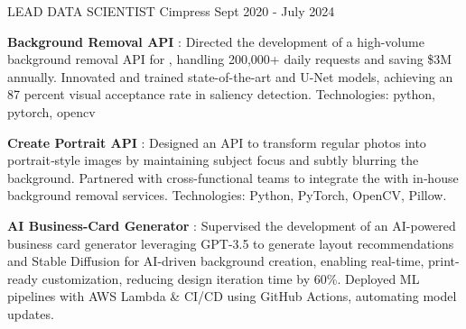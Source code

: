 
\begin{cventries}

    \cventry
    {LEAD DATA SCIENTIST} %
    {Cimpress} %
    {} %
    {Sept 2020 - July 2024} %
    {
      \begin{cvitems} %
      \item{\textbf{Background Removal API} : \newline 
      Directed the development of a high-volume background removal API for ,  
      handling 200,000+ daily requests and saving \$3M annually. \newline 
      Innovated and trained state-of-the-art  and 
      U-Net models, achieving an 87 percent visual acceptance rate in saliency 
      detection. \newline 
      Technologies: python, pytorch, opencv }
      \item{\textbf{Create Portrait API} : \newline
      Designed an API to transform regular photos into portrait‐style images by maintaining subject focus and subtly blurring the background.
      \newline 
      Partnered with cross-functional teams to integrate the  with in‐house background removal services.
      \newline
      Technologies: Python, PyTorch, OpenCV, Pillow. }
      \item{\textbf{AI Business-Card Generator} : \newline
      Supervised the development of an AI-powered business card generator leveraging GPT-3.5 to generate layout recommendations and Stable Diffusion for AI-driven background creation, enabling real-time, print-ready customization, reducing design iteration time by 60\%. 
      \newline
      Deployed ML pipelines with AWS Lambda \& CI/CD using GitHub Actions, automating model updates.
}
\end{cvitems}}
\end{cventries}
